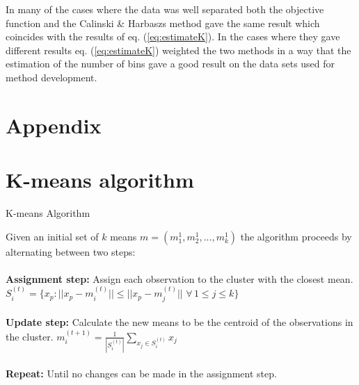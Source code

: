 In many of the cases where the data was well separated both the objective function and the Calinski \& Harbaszs method gave the same result which coincides with the results of eq. (\ref{eq:estimateK}). In the cases where they gave different results eq. (\ref{eq:estimateK}) weighted the two methods in a way that the estimation of the number of bins gave a good result on the data sets used for method development.



\pagebreak
\appendix
\section*{Appendix}

\section{K-means algorithm}

\begin{algorithm}
	\caption{K-means Algorithm}
	Given an initial set of $k$ means $m = (m_1^1, m_2^1, ..., m_k^1)$ the algorithm proceeds by alternating between two steps:
	\\ 
	\\
	{\bf Assignment step: } Assign each observation to the cluster with the closest mean.
	$S_i^{(t)} = \{ x_p : || x_p - m_i^{(t)} || \leq || x_p - m_j^{(t)} || \,\, \forall \, 1 \leq j \leq k \}$ 
	\\
	\\
	{\bf Update step: } Calculate the new means to be the centroid of the observations in the cluster.
	$m_i^{(t+1)} = \frac{1}{| S_i^{(t)} |} \sum_{x_j \in S_i^{(t)}} x_j$
	\\
	\\
	{\bf Repeat: } Until no changes can be made in the assignment step.


\label{kmeans}
	   
\end{algorithm}


